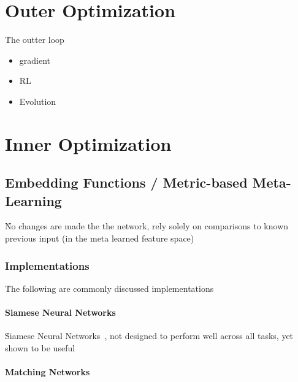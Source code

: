 \section{Outer Optimization}

\r{The outter loop}

\begin{itemize}[noitemsep,topsep=0pt]
	\item gradient
	\item RL
	\item Evolution
\end{itemize}

\section{Inner Optimization}



\subsection{Embedding Functions / Metric-based Meta-Learning}


\r{No changes are made the the network, rely solely on comparisons to known previous input (in the meta learned feature space)}


\subsubsection{Implementations}

\r{The following are commonly discussed implementations}

\paragraph{Siamese Neural Networks}

\r{Siamese Neural Networks~\cite{bromley1994signature}, not designed to perform well across all tasks, yet shown to be useful~\cite{Koch2015SiameseNN}}

\paragraph{Matching Networks}

